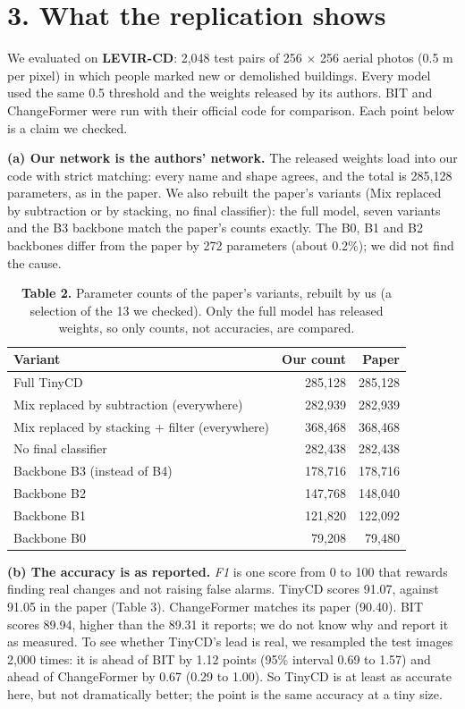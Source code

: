 \documentclass[10pt,a4paper]{article}
\begin{document}
\section*{3. What the replication shows}
We evaluated on \textbf{LEVIR-CD}: 2,048 test pairs of 256 $\times$ 256 aerial photos (0.5 m per pixel) in which people marked new or demolished buildings. Every model used the same 0.5 threshold and the weights released by its authors. BIT and ChangeFormer were run with their official code for comparison. Each point below is a claim we checked.

\textbf{(a) Our network is the authors' network.} The released weights load into our code with strict matching: every name and shape agrees, and the total is 285,128 parameters, as in the paper. We also rebuilt the paper's variants (Mix replaced by subtraction or by stacking, no final classifier): the full model, seven variants and the B3 backbone match the paper's counts exactly. The B0, B1 and B2 backbones differ from the paper by 272 parameters (about 0.2\%); we did not find the cause.

\begin{table}[h!]\centering\small
\begin{tabular}{lrr}
\toprule
Variant & Our count & Paper \\
\midrule
Full TinyCD & 285,128 & 285,128 \\
Mix replaced by subtraction (everywhere) & 282,939 & 282,939 \\
Mix replaced by stacking + filter (everywhere) & 368,468 & 368,468 \\
No final classifier & 282,438 & 282,438 \\
Backbone B3 (instead of B4) & 178,716 & 178,716 \\
Backbone B2 & 147,768 & 148,040 \\
Backbone B1 & 121,820 & 122,092 \\
Backbone B0 & 79,208 & 79,480 \\
\bottomrule
\end{tabular}
\caption*{\textbf{Table 2.} Parameter counts of the paper's variants, rebuilt by us (a selection of the 13 we checked). Only the full model has released weights, so only counts, not accuracies, are compared.}\end{table}
\textbf{(b) The accuracy is as reported.} \emph{F1} is one score from 0 to 100 that rewards finding real changes and not raising false alarms. TinyCD scores 91.07, against 91.05 in the paper (Table 3). ChangeFormer matches its paper (90.40). BIT scores 89.94, higher than the 89.31 it reports; we do not know why and report it as measured. To see whether TinyCD's lead is real, we resampled the test images 2,000 times: it is ahead of BIT by 1.12 points (95\% interval 0.69 to 1.57) and ahead of ChangeFormer by 0.67 (0.29 to 1.00). So TinyCD is at least as accurate here, but not dramatically better; the point is the same accuracy at a tiny size.
\end{document}
